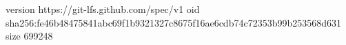 version https://git-lfs.github.com/spec/v1
oid sha256:fe46b48475841abc69f1b9321327c8675f16ae6cdb74c72353b99b253568d631
size 699248
